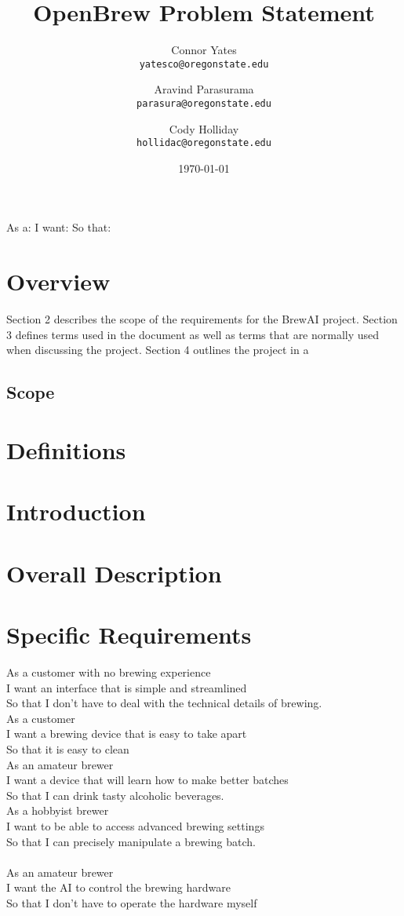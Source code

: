 \documentclass[letterpaper,10pt]{article}
\author{Connor Yates\\
\texttt{yatesco@oregonstate.edu}
\and
Aravind Parasurama\\
\texttt{parasura@oregonstate.edu}
\and
Cody Holliday\\
\texttt{hollidac@oregonstate.edu}}
\date{\today}
\title{OpenBrew Problem Statement}
\begin{document}
As a:
I want:
So that:
\section{Overview}
Section 2 describes the scope of the requirements for the BrewAI project.
Section 3 defines terms used in the document as well as terms that are
normally used when discussing the project. Section 4 outlines the project
in a 
\subsection{Scope}

\section{Definitions}

\section{Introduction}
\section{Overall Description}


\section{Specific Requirements}
As a customer with no brewing experience\\
I want an interface that is simple and streamlined\\
So that I don't have to deal with the technical details of brewing.\\

As a customer\\
I want a brewing device that is easy to take apart\\
So that it is easy to clean\\

As an amateur brewer\\
I want a device that will learn how to make better batches\\
So that I can drink tasty alcoholic beverages.\\

As a hobbyist brewer\\
I want to be able to access advanced brewing settings\\
So that I can precisely manipulate a brewing batch.\\
\\
As an amateur brewer\\
I want the AI to control the brewing hardware\\
So that I don't have to operate the hardware myself\\
\end{document}

